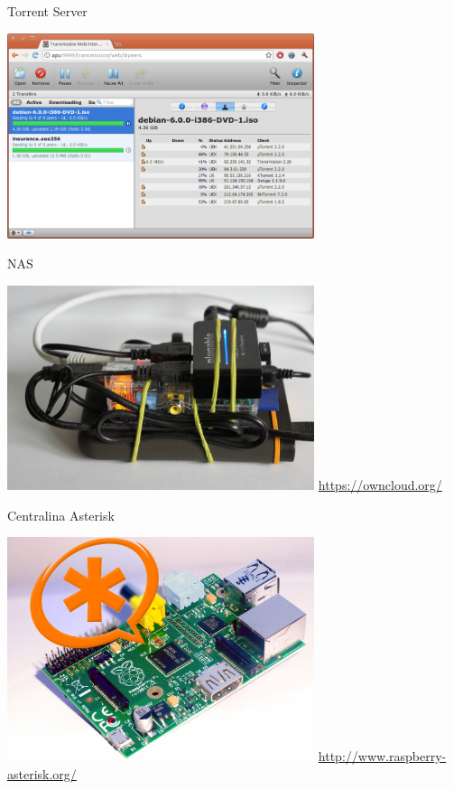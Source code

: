 \documentclass[xcolor=svgnames,11pt]{beamer}
\begin{document}
\begin{frame}{Torrent Server}
\begin{center}
\includegraphics[width=9cm]{uc/torrent.png}
\end{center}
\end{frame}

\begin{frame}{NAS}
\begin{center}
\includegraphics[width=9cm]{uc/nas.jpg}
\newline
\medskip
\url{https://owncloud.org/}
\end{center}
\end{frame}

\begin{frame}{Centralina Asterisk}
\begin{center}
\includegraphics[width=9cm]{uc/asterisk.jpg}
\newline
\medskip
\url{http://www.raspberry-asterisk.org/}
\end{center}
\end{frame}
\end{document}
